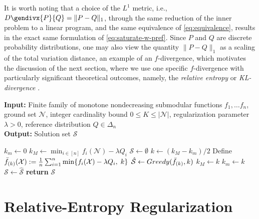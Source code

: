 \documentclass[letter,11pt]{article}
\newcommand{\gendiv}{D\gendivx}
\def\sS{\mathcal{S}}
\def\sN{\mathcal{N}}
\begin{document}
It is worth noting that a choice of the $L^1$ metric, i.e., $\gendiv{P}{Q} = \lVert P - Q \rVert_1$, through the same reduction of the inner problem to a linear program, and the same equivalence of \eqref{eq:equivalence}, results in the exact same formulation of \eqref{eq:saturate-w-pref}. Since $P$ and $Q$ are discrete probability distributions, one may also view the quantity $\lVert P - Q \rVert_1$ as a scaling of the total variation distance, an example of an $f$-divergence, which motivates the discussion of the next section, where we use one specific $f$-divergence with particularly significant theoretical outcomes, namely, the \textit{relative entropy} or \textit{KL-divergence} \cite{kullback1951information}.
\begin{algorithm}[t]
\caption{\textsc{Saturate with Preference}}
\label{alg:ssa-w-pref}
\hspace*{\algorithmicindent}\textbf{Input:} Finite family of monotone nondecreasing submodular functions $f_1, \ldots f_n$, ground set $\sN$, integer cardinality bound $0 \le K\le \lvert \sN \rvert$, regularization parameter $\lambda > 0$, reference distribution $Q \in \Delta_n$ \\
\hspace*{\algorithmicindent}\textbf{Output:} Solution set $\sS$
\begin{algorithmic}[1]
\STATE $k_m \leftarrow 0$
\STATE $k_M \leftarrow \min_{i\in[n]} f_i(\sN) - \lambda Q_i$
\STATE $\sS \leftarrow \emptyset$
\STATE $k \leftarrow (k_M - k_m)/2$
\STATE Define $\Bar{f}_{(k)}(\mathcal{X}) := \frac{1}{n}\sum_{i=1}^n \min\{f_i(\mathcal{X})-\lambda Q_i,\; k\}$
\STATE $\hat{\sS} \leftarrow \textsc{Greedy}(\Bar{f}_{(k)}, k)$
\IF{$\lvert\hat{\sS}\rvert > \alpha K$}
\STATE $k_M \leftarrow k$
\ELSE
\STATE $k_m \leftarrow k$
\STATE $\sS \leftarrow \hat{\sS}$
\ENDIF
\ENDWHILE
\STATE \textbf{return} $\sS$
\end{algorithmic}
\end{algorithm}
\section{Relative-Entropy Regularization}\label{sec:theoretical}
\end{document}
